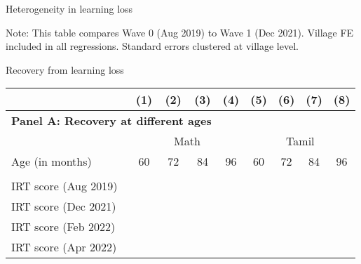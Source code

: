 \documentclass[aspectratio=169,numbering=none]{beamer}
\begin{document}
\begin{frame}[plain]{Heterogeneity in learning loss}
\centering
{}
\raggedright \footnotesize{Note: This table compares Wave 0 (Aug 2019) to Wave 1 (Dec 2021). Village FE included in all regressions. Standard errors clustered at village level.}
\end{frame}

\begin{frame}{Recovery from learning loss}
\begin{table}[H]
\centering
\footnotesize
\centering
    \begin{tabular}{lcccccccc}
    \toprule
  & (1) & (2) & (3) & (4) & (5) & (6) & (7) & (8) \\
\midrule
\multicolumn{4}{l}{\textbf{Panel A: Recovery at different ages}}\\
&	\multicolumn{4}{c}{Math}&	\multicolumn{4}{c}{Tamil} \\
 \cmidrule(lr){2-5} \cmidrule(lr){6-9}
Age (in months) &  60  & 72  & 84  & 96  &  60  & 72  & 84  & 96  \\
\\
IRT score (Aug 2019) &  &  &  &  &  &  &  &    \\
IRT score (Dec 2021) &  &  &  &  &  &  &  &    \\
IRT score (Feb 2022) &  &  &  &  &  &  &  &    \\
IRT score (Apr 2022) &  &  &  &  &  &  &  &    \\

\end{tabular}
\end{table}
\end{frame}
\end{document}
